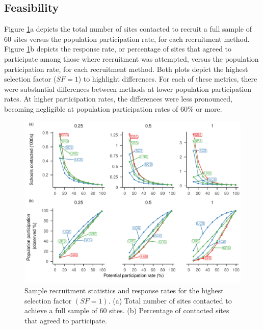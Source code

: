 \documentclass[
  english,
  man,floatsintext]{apa6}
\begin{document}
\hypertarget{feasibility-1}{%
\subsection*{Feasibility}\label{feasibility-1}}

Figure \ref{fig:fig-responses}a depicts the total number of sites contacted to recruit a full sample of 60 sites versus the population participation rate, for each recruitment method. Figure \ref{fig:fig-responses}b depicts the response rate, or percentage of sites that agreed to participate among those where recruitment was attempted, versus the population participation rate, for each recruitment method. Both plots depict the highest selection factor (\(SF = 1\)) to highlight differences. For each of these metrics, there were substantial differences between methods at lower population participation rates. At higher participation rates, the differences were less pronounced, becoming negligible at population participation rates of 60\% or more.



\begin{figure}
\centering
\includegraphics{6---Paper_files/figure-latex/fig-responses-1.pdf}
\caption{\label{fig:fig-responses}Sample recruitment statistics and response rates for the highest selection factor \((SF = 1)\). (a) Total number of sites contacted to achieve a full sample of 60 sites. (b) Percentage of contacted sites that agreed to participate.}
\end{figure}
\end{document}
